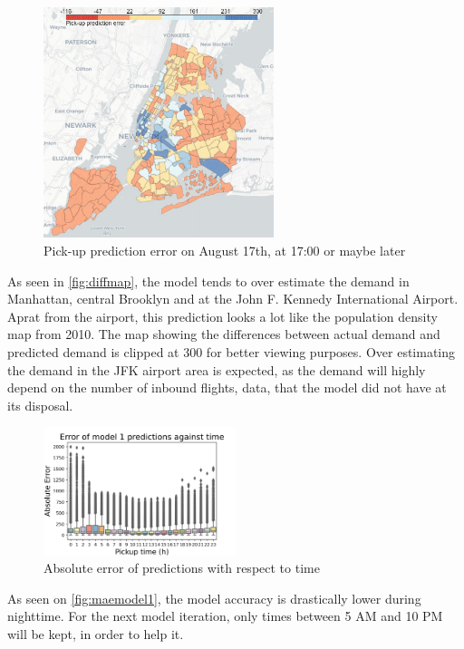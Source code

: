 \documentclass[11pt]{article}
\begin{document}
\begin{figure}
    \includegraphics[width=0.60\textwidth]{august2019pudiffmap.jpg}
    \centering
    \caption{Pick-up prediction error on August 17th, at 17:00 or maybe later} 
\end{figure}\label{fig:diffmap}

As seen in \autoref{fig:diffmap}, the model tends to over estimate the demand in Manhattan, central Brooklyn and at the John F. Kennedy International Airport. Aprat from the airport, this prediction looks a lot like the population density map from 2010. The map showing the differences between actual demand and predicted demand is clipped at 300 for better viewing purposes. Over estimating the demand in the JFK airport area is expected, as the demand will highly depend on the number of inbound flights, data, that the model did not have at its disposal.
\begin{figure}
    \includegraphics[width=0.5\textwidth]{model1_error_hour.jpeg}
    \centering
    \caption{Absolute error of predictions with respect to time} 
\end{figure}\label{fig:maemodel1}
As seen on \autoref{fig:maemodel1}, the model accuracy is drastically lower during nighttime. For the next model iteration, only times between 5 AM and 10 PM will be kept, in order to help it. 
\end{document}
